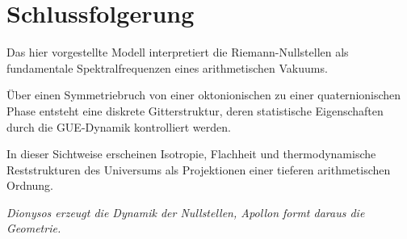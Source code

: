\documentclass[11pt,a4paper]{article}
\begin{document}
\section{Schlussfolgerung}

Das hier vorgestellte Modell interpretiert die Riemann-Nullstellen als fundamentale Spektralfrequenzen eines arithmetischen Vakuums.

Über einen Symmetriebruch von einer oktonionischen zu einer quaternionischen Phase entsteht eine diskrete Gitterstruktur, deren statistische Eigenschaften durch die GUE-Dynamik kontrolliert werden.

In dieser Sichtweise erscheinen Isotropie, Flachheit und thermodynamische Reststrukturen des Universums als Projektionen einer tieferen arithmetischen Ordnung.

\vspace{1cm}

\begin{center}
\emph{
Dionysos erzeugt die Dynamik der Nullstellen,
Apollon formt daraus die Geometrie.
}
\end{center}
\end{document}

